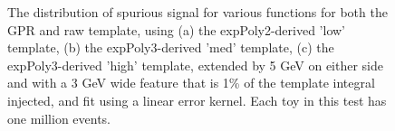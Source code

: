 \begin{figure} 
\begin{center}

\caption{The distribution of spurious signal for various functions for both the GPR and raw template, using (a) the expPoly2-derived 'low' template, (b) the expPoly3-derived 'med' template, (c) the expPoly3-derived 'high' template, extended by 5 GeV on either side and with a 3 GeV wide feature that is 1\% of the template integral injected, and fit using a linear error kernel. Each toy in this test has one million events.}
\label{fig:linearkernel_lowpt_10k_Siginj}
\end{center}
\end{figure}

